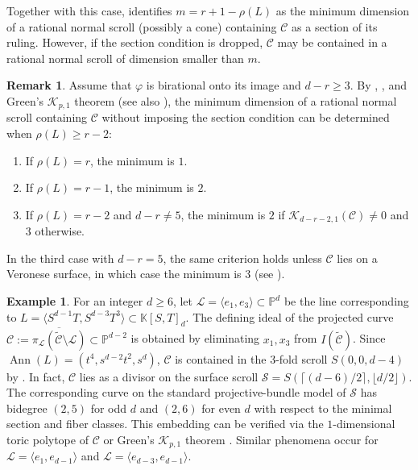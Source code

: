 \documentclass[a4paper, 11pt]{amsart}
\numberwithin{theorem}{section}
\theoremstyle{definition}
\newtheorem{example}[theorem]{Example}
\newtheorem{remark}[theorem]{Remark}
\numberwithin{equation}{section}
\begin{document}
Together with this case,  identifies $m=r+1-\rho(L)$ as the minimum dimension of a rational normal scroll (possibly a cone) containing $\mathcal{C}$ as a section of its ruling.
However, if the section condition is dropped, $\mathcal{C}$ may be contained in a rational normal scroll of dimension smaller than $m$.

\begin{remark}
Assume that $\varphi$ is birational onto its image and $d-r\geq3$.
By , , and Green's $\mathcal K_{p,1}$ theorem \cite{MR739785} (see also \cite[Theorem~1.1]{MR4816776}), the minimum dimension of a rational normal scroll containing $\mathcal{C}$ without imposing the section condition can be determined when $\rho(L)\geq r-2$:
\begin{enumerate}
    \item If $\rho(L)=r$, the minimum is $1$.
    \item If $\rho(L)=r-1$, the minimum is $2$.
    \item If $\rho(L)=r-2$ and $d-r\neq5$, the minimum is $2$ if $\mathcal{K}_{d-r-2,1}(\mathcal{C})\neq0$ and $3$ otherwise.
\end{enumerate}
In the third case with $d-r=5$, the same criterion holds unless $\mathcal{C}$ lies on a Veronese surface, in which case the minimum is $3$ (see \cite[Theorem~5.2]{MR4816776}).
\end{remark}
\begin{example}
For an integer $d \ge 6$, let $\mathcal{L} = \langle e_1, e_3 \rangle \subset \mathbb{P}^d$ be the line corresponding to $L = \langle S^{d-1}T, S^{d-3}T^3 \rangle \subset \mathbb{K}[S,T]_d$. 
The defining ideal of the projected curve $\mathcal{C} := \overline{\pi_{\mathcal{L}}(\widetilde{\mathcal{C}}\setminus \mathcal{L})} \subset \mathbb{P}^{d-2}$ is obtained by eliminating $x_1, x_3$ from $I(\widetilde{\mathcal{C}})$. 
Since $\operatorname{Ann}(L) = (t^4, s^{d-2}t^2, s^d)$, $\mathcal{C}$ is contained in the $3$-fold scroll $S(0,0,d-4)$ by . 
In fact, $\mathcal{C}$ lies as a divisor on the surface scroll $\mathcal{S}=S(\lceil(d-6)/2\rceil,\lfloor d/2\rfloor)$.
The corresponding curve on the standard projective-bundle model of $\mathcal{S}$ has bidegree $(2,5)$ for odd $d$ and $(2,6)$ for even $d$ with respect to the minimal section and fiber classes.
This embedding can be verified via the $1$-dimensional toric polytope of $\mathcal{C}$ or Green's $\mathcal{K}_{p,1}$ theorem \cite{MR739785}.
Similar phenomena occur for $\mathcal{L} = \langle e_1, e_{d-1} \rangle$ and $\mathcal{L} = \langle e_{d-3}, e_{d-1} \rangle$.
\end{example}
\end{document}
